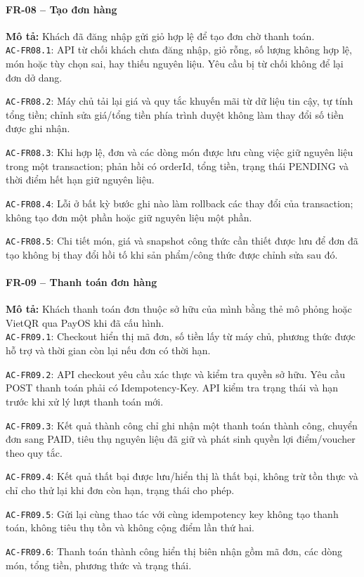 \paragraph{FR-08 -- Tạo đơn hàng}
\textbf{Mô tả:} Khách đã đăng nhập gửi giỏ hợp lệ để tạo đơn chờ thanh toán.\\
\noindent\texttt{AC-FR08.1}: API từ chối khách chưa đăng nhập, giỏ rỗng, số lượng không hợp lệ, món hoặc tùy chọn sai, hay thiếu nguyên liệu. Yêu cầu bị từ chối không để lại đơn dở dang.\par
\noindent\texttt{AC-FR08.2}: Máy chủ tải lại giá và quy tắc khuyến mãi từ dữ liệu tin cậy, tự tính tổng tiền; chỉnh sửa giá/tổng tiền phía trình duyệt không làm thay đổi số tiền được ghi nhận.\par
\noindent\texttt{AC-FR08.3}: Khi hợp lệ, đơn và các dòng món được lưu cùng việc giữ nguyên liệu trong một transaction; phản hồi có orderId, tổng tiền, trạng thái PENDING và thời điểm hết hạn giữ nguyên liệu.\par
\noindent\texttt{AC-FR08.4}: Lỗi ở bất kỳ bước ghi nào làm rollback các thay đổi của transaction; không tạo đơn một phần hoặc giữ nguyên liệu một phần.\par
\noindent\texttt{AC-FR08.5}: Chi tiết món, giá và snapshot công thức cần thiết được lưu để đơn đã tạo không bị thay đổi hồi tố khi sản phẩm/công thức được chỉnh sửa sau đó.\par

\paragraph{FR-09 -- Thanh toán đơn hàng}
\textbf{Mô tả:} Khách thanh toán đơn thuộc sở hữu của mình bằng thẻ mô phỏng hoặc VietQR qua PayOS khi đã cấu hình.\\
\noindent\texttt{AC-FR09.1}: Checkout hiển thị mã đơn, số tiền lấy từ máy chủ, phương thức được hỗ trợ và thời gian còn lại nếu đơn có thời hạn.\par
\noindent\texttt{AC-FR09.2}: API checkout yêu cầu xác thực và kiểm tra quyền sở hữu. Yêu cầu POST thanh toán phải có Idempotency-Key. API kiểm tra trạng thái và hạn trước khi xử lý lượt thanh toán mới.\par
\noindent\texttt{AC-FR09.3}: Kết quả thành công chỉ ghi nhận một thanh toán thành công, chuyển đơn sang PAID, tiêu thụ nguyên liệu đã giữ và phát sinh quyền lợi điểm/voucher theo quy tắc.\par
\noindent\texttt{AC-FR09.4}: Kết quả thất bại được lưu/hiển thị là thất bại, không trừ tồn thực và chỉ cho thử lại khi đơn còn hạn, trạng thái cho phép.\par
\noindent\texttt{AC-FR09.5}: Gửi lại cùng thao tác với cùng idempotency key không tạo thanh toán, không tiêu thụ tồn và không cộng điểm lần thứ hai.\par
\noindent\texttt{AC-FR09.6}: Thanh toán thành công hiển thị biên nhận gồm mã đơn, các dòng món, tổng tiền, phương thức và trạng thái.\par

